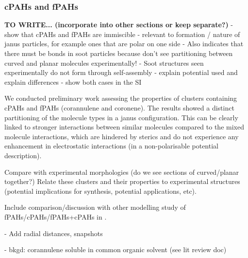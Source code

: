 \subsubsection{cPAHs and fPAHs}
\textbf{TO WRITE... (incorporate into other sections or keep separate?)}
- show that cPAHs and fPAHs are immiscible 
- relevant to formation / nature of janus particles, for example ones that are polar on one side
- Also indicates that there must be bonds in soot particles because don’t see partitioning between curved and planar molecules experimentally!
- Soot structures seen experimentally do not form through self-assembly
- explain potential used and explain differences - show both cases in the SI

We conducted preliminary work assessing the properties of clusters containing cPAHs and fPAHs (corannulene and coronene). The results showed a distinct partitioning of the molecule types in a janus configuration. This can be clearly linked to stronger interactions between similar molecules compared to the mixed molecule interactions, which are hindered by sterics and do not experience any enhancement in electrostatic interactions (in a non-polarisable potential description).

Compare with experimental morphologies (do we see sections of curved/planar together?)
Relate these clusters and their properties to experimental structures (potential implications for synthesis, potential applications, etc).

Include comparison/discussion with other modelling study of fPAHs/cPAHs/fPAHs+cPAHs in \cite{zhang2020molecular}.

- Add radial distances, snapshots

- bkgd: corannulene soluble in common organic solvent (see lit review doc)

